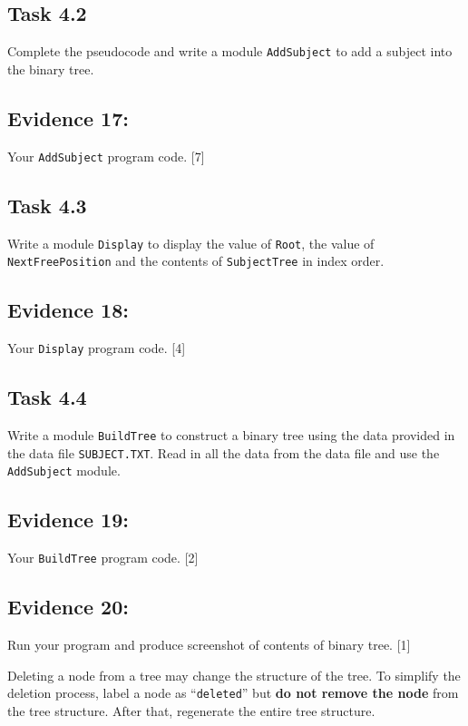 \subsection*{Task 4.2 }

Complete the pseudocode and write a module \texttt{AddSubject} to
add a subject into the binary tree. 

\subsection*{Evidence 17:}

Your \texttt{AddSubject} program code. \hfill{} {[}7{]}

\subsection*{Task 4.3 }

Write a module \texttt{Display} to display the value of \texttt{Root},
the value of \texttt{NextFreePosition} and the contents of \texttt{SubjectTree}
in index order. 

\subsection*{Evidence 18: }

Your \texttt{Display} program code. \hfill{} {[}4{]}

\subsection*{Task 4.4}

Write a module \texttt{BuildTree} to construct a binary tree using
the data provided in the data file \texttt{SUBJECT.TXT}. Read in all
the data from the data file and use the \texttt{AddSubject} module. 

\subsection*{Evidence 19: }

Your \texttt{BuildTree} program code. \hfill{}{[}2{]}

\subsection*{Evidence 20:}

Run your program and produce screenshot of contents of binary tree.
\hfill{} {[}1{]}

Deleting a node from a tree may change the structure of the tree.
To simplify the deletion process, label a node as \textquotedblleft \texttt{deleted}\textquotedblright{}
but \textbf{do not remove the node} from the tree structure. After
that, regenerate the entire tree structure.


